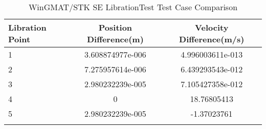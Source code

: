 \begin{table}[htbp!]
\centering
\caption{ WinGMAT/STK SE LibrationTest Test Case Comparison}
      \begin{tabular}{lcc}
      \hline\hline
          Libration Point & Position Difference(m) & Velocity Difference(m/s) \\
         \hline
         1 & 3.608874977e-006 & 4.996003611e-013 \\
         2 & 7.275957614e-006 & 6.439293543e-012 \\
         3 & 2.980232239e-005 & 7.105427358e-012 \\
         4 & 0 & 18.76805413 \\
         5 & 2.980232239e-005 & -1.37023761 \\
      \hline\hline
      \label{Table: WinGMAT-STK SE LibrationTest Table} 
\end{tabular}
\end{table}
